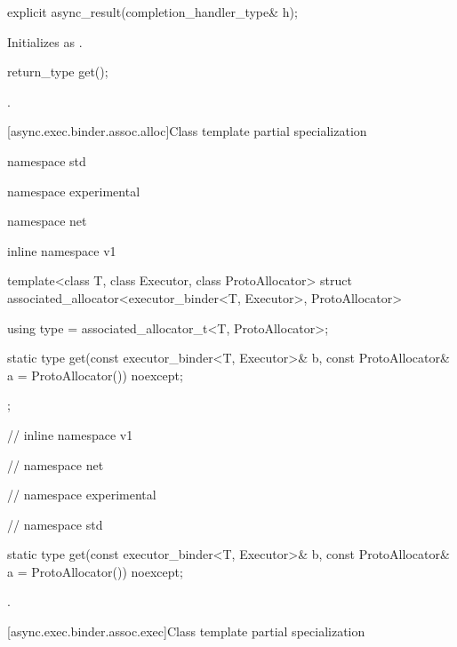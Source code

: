\begin{itemdecl}
explicit async_result(completion_handler_type& h);
\end{itemdecl}

\begin{itemdescr}
\pnum
\effects Initializes  as .
\end{itemdescr}

\begin{itemdecl}
return_type get();
\end{itemdecl}

\begin{itemdescr}
\pnum
\returns {}.
\end{itemdescr}



[async.exec.binder.assoc.alloc]{Class template partial specialization }

%
%
\begin{codeblock}
namespace std {
namespace experimental {
namespace net {
inline namespace v1 {

  template<class T, class Executor, class ProtoAllocator>
    struct associated_allocator<executor_binder<T, Executor>, ProtoAllocator>
  {
    using type = associated_allocator_t<T, ProtoAllocator>;

    static type get(const executor_binder<T, Executor>& b,
                    const ProtoAllocator& a = ProtoAllocator()) noexcept;
  };

} // inline namespace v1
} // namespace net
} // namespace experimental
} // namespace std
\end{codeblock}

\begin{itemdecl}
static type get(const executor_binder<T, Executor>& b,
                const ProtoAllocator& a = ProtoAllocator()) noexcept;
\end{itemdecl}

\begin{itemdescr}
\pnum
\returns {}.
\end{itemdescr}



[async.exec.binder.assoc.exec]{Class template partial specialization }


